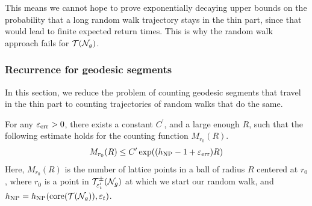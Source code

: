 This means we cannot hope to prove exponentially decaying upper bounds on the probability that a long random walk trajectory stays in the thin part, since that would lead to finite expected return times.
This is why the random walk approach fails for $\mathcal{T}(\mathcal{N}_g)$.

\subsubsection{Recurrence for geodesic segments}
\label{sec:recurr-geod-segm}

In this section, we reduce the problem of counting geodesic segments that travel in the thin part to counting trajectories of random walks that do the same.

\begin{proposition}
  \label{prop:counting-geodesics}
  For any $\varepsilon_{\mathrm{err}} > 0$,
  there exists a constant $C^{\prime}$, and a large enough $R$, such that the following estimate holds for the counting function $M_{r_0}(R)$.
  \begin{align*}
    M_{r_0}(R) \leq C^{\prime} \exp((h_{\mathrm{NP}} - 1 + \varepsilon_{\mathrm{err}})R)
  \end{align*}
  Here, $M_{r_0}(R)$ is the number of \concave lattice points in a ball of radius $R$ centered at $r_0$, where $r_0$ is a point in $\mathcal{T}_{\varepsilon_t^{\prime}}^{\pm}(\mathcal{N}_g)$ at which we start our random walk, and $h_{\mathrm{NP}} = h_{\mathrm{NP}}(\mathrm{core}(\mathcal{T}(\mathcal{N}_g)), \varepsilon_t)$.
\end{proposition}

